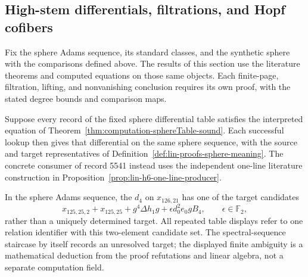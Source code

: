 

\subsection{High-stem differentials, filtrations, and Hopf cofibers}
\label{sec:near126-internal-deductions}

Fix the sphere Adams sequence, its standard classes, and the synthetic sphere
with the comparisons defined above. The results of this section use the
literature theorems and computed equations on those same objects. Each
finite-page, filtration, lifting, and nonvanishing conclusion requires its
own proof, with the stated degree bounds and comparison maps.

\begin{theorem}
  \label{thm:lin-proofs-sphere-sound}
  \notready
  Suppose every record of the fixed sphere differential table satisfies
  the interpreted equation of Theorem~\ref{thm:computation-sphereTable-sound}.
  Each successful lookup then gives that differential on the same sphere
  sequence, with the source and target representatives of
  Definition~\ref{def:lin-proofs-sphere-meaning}. The concrete consumer of
  record 5541 instead uses the independent one-line literature construction
  in Proposition~\ref{prop:lin-h6-one-line-producer}.
\end{theorem}

\begin{proposition}
  \label{prop:x_126_21-ambiguity}
  \notready
  In the sphere Adams sequence, the $d_4$
  on $x_{126,21}$ has one of the target candidates
  \[
    x_{125,25,2}+x_{125,25}+g^4\Delta h_1g
      +\epsilon d_0^2e_0gB_4,
    \qquad \epsilon\in\mathbb F_2,
  \]
  rather than a uniquely determined target. All repeated table displays
  refer to one relation identifier with this two-element candidate set.
  The spectral-sequence staircase by itself records an unresolved target;
  the displayed finite ambiguity is a mathematical deduction from the
  proof refutations and linear algebra, not a separate computation field.
\end{proposition}

